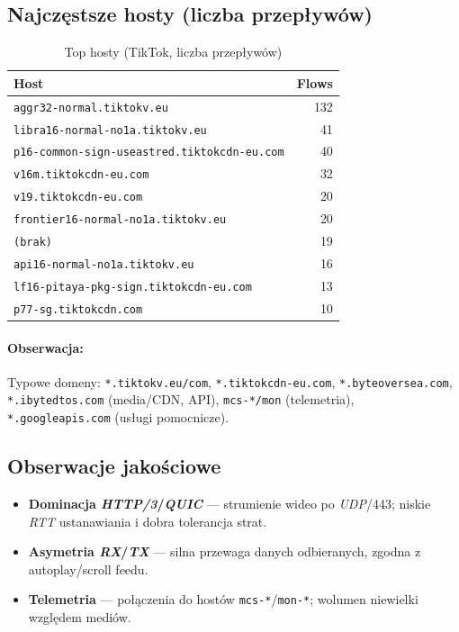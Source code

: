 \subsection{Najczęstsze hosty (liczba przepływów)}
\begin{table}[H]
  \centering
  \caption{Top hosty (TikTok, liczba przepływów)}
  \label{tab:tiktok-hosts}
  \begin{tabular}{lr}
    \toprule
    \textbf{Host} & \textbf{Flows} \\
    \midrule
    \texttt{aggr32-normal.tiktokv.eu} & 132 \\
    \texttt{libra16-normal-no1a.tiktokv.eu} & 41 \\
    \texttt{p16-common-sign-useastred.tiktokcdn-eu.com} & 40 \\
    \texttt{v16m.tiktokcdn-eu.com} & 32 \\
    \texttt{v19.tiktokcdn-eu.com} & 20 \\
    \texttt{frontier16-normal-no1a.tiktokv.eu} & 20 \\
    \texttt{(brak)} & 19 \\
    \texttt{api16-normal-no1a.tiktokv.eu} & 16 \\
    \texttt{lf16-pitaya-pkg-sign.tiktokcdn-eu.com} & 13 \\
    \texttt{p77-sg.tiktokcdn.com} & 10 \\
    \bottomrule
  \end{tabular}
\end{table}

\paragraph{Obserwacja:}
Typowe domeny: \texttt{*.tiktokv.eu/com}, \texttt{*.tiktokcdn-eu.com}, \texttt{*.byteoversea.com}, \texttt{*.ibytedtos.com} (media/CDN, API), \texttt{mcs-*/mon} (telemetria), \texttt{*.googleapis.com} (usługi pomocnicze).

\subsection{Obserwacje jakościowe}
\begin{itemize}
  \item \textbf{Dominacja \emph{HTTP/3}/\emph{QUIC}} — strumienie wideo po \emph{UDP}/443; niskie \emph{RTT} ustanawiania i dobra tolerancja strat.
  \item \textbf{Asymetria \emph{RX}/\emph{TX}} — silna przewaga danych odbieranych, zgodna z autoplay/scroll feedu.
  \item \textbf{Telemetria} — połączenia do hostów \texttt{mcs-*}/\texttt{mon-*}; wolumen niewielki względem mediów.
\end{itemize}

